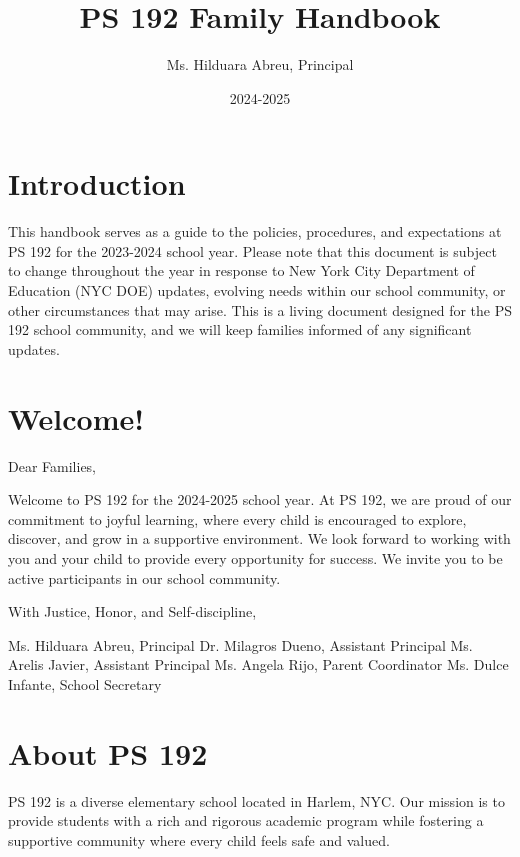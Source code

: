 \documentclass[11pt]{article}
\author{Ms. Hilduara Abreu, Principal}
\date{2024-2025}
\title{PS 192 Family Handbook}
\begin{document}


\pagenumbering{\fancyhf{}}
\pagestyle{headings}

\fancyhead[R]{\thepage}

\pagestyle{fancy}
\renewcommand{\footrulewidth}{1px}


\clearpage
\clearpage \tableofcontents \clearpage
\section{Introduction}
\label{sec:org110a480}
This handbook serves as a guide to the policies, procedures, and expectations at PS 192 for the 2023-2024 school year. Please note that this document is subject to change throughout the year in response to New York City Department of Education (NYC DOE) updates, evolving needs within our school community, or other circumstances that may arise. This is a living document designed for the PS 192 school community, and we will keep families informed of any significant updates.

\section{Welcome!}
\label{sec:org6a4cc3f}
Dear Families,

Welcome to PS 192 for the 2024-2025 school year. At PS 192, we are proud of our commitment to joyful learning, where every child is encouraged to explore, discover, and grow in a supportive environment. We look forward to working with you and your child to provide every opportunity for success. We invite you to be active participants in our school community.

With Justice, Honor, and Self-discipline,

Ms. Hilduara Abreu, Principal
Dr. Milagros Dueno, Assistant Principal
Ms. Arelis Javier, Assistant Principal
Ms. Angela Rijo, Parent Coordinator
Ms. Dulce Infante, School Secretary

\section{About PS 192}
\label{sec:orgb861cdf}
PS 192 is a diverse elementary school located in Harlem, NYC. Our mission is to provide students with a rich and rigorous academic program while fostering a supportive community where every child feels safe and valued.
\end{document}
